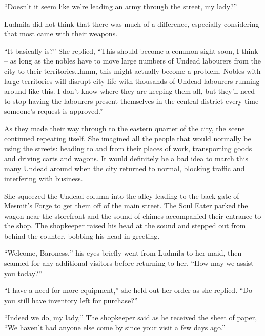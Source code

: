  

“Doesn’t it seem like we’re leading an army through the street, my lady?”

 

Ludmila did not think that there was much of a difference, especially considering that most came with their weapons.

 

“It basically is?” She replied, “This should become a common sight soon, I think – as long as the nobles have to move large numbers of Undead labourers from the city to their territories…hmm, this might actually become a problem. Nobles with large territories will disrupt city life with thousands of Undead labourers running around like this. I don’t know where they are keeping them all, but they’ll need to stop having the labourers present themselves in the central district every time someone’s request is approved.”

 

As they made their way through to the eastern quarter of the city, the scene continued repeating itself. She imagined all the people that would normally be using the streets: heading to and from their places of work, transporting goods and driving carts and wagons. It would definitely be a bad idea to march this many Undead around when the city returned to normal, blocking traffic and interfering with business.

 

She squeezed the Undead column into the alley leading to the back gate of Mesmit’s Forge to get them off of the main street. The Soul Eater parked the wagon near the storefront and the sound of chimes accompanied their entrance to the shop. The shopkeeper raised his head at the sound and stepped out from behind the counter, bobbing his head in greeting.

 

“Welcome, Baroness,” his eyes briefly went from Ludmila to her maid, then scanned for any additional visitors before returning to her. “How may we assist you today?”

 

“I have a need for more equipment,” she held out her order as she replied. “Do you still have inventory left for purchase?”

 

“Indeed we do, my lady,” The shopkeeper said as he received the sheet of paper, “We haven’t had anyone else come by since your visit a few days ago.”

 

